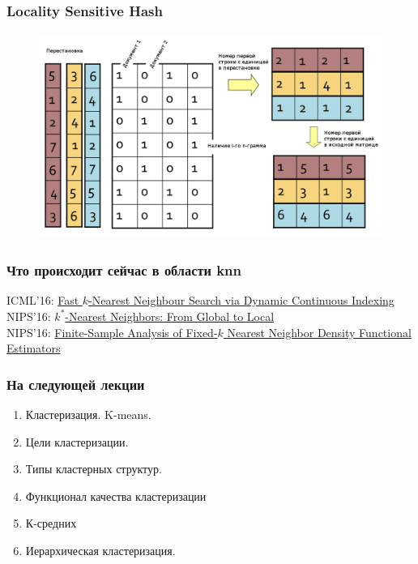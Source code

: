 \documentclass[10pt]{beamer}
\begin{document}
\begin{frame}\frametitle{Locality Sensitive Hash}
	\begin{figure}[htbp]
	\centering
	\includegraphics[height=190pt]{images/min-hash1}  
	\end{figure}
\end{frame}

\begin{frame}\frametitle{Что происходит сейчас в области knn}
  ICML'16: \href{http://jmlr.org/proceedings/papers/v48/lic16.pdf}{Fast $k$-Nearest Neighbour Search via Dynamic Continuous Indexing}\\
  \bigbreak
  NIPS'16: \href{http://papers.nips.cc/paper/6373-k-nearest-neighbors-from-global-to-local.pdf}{$k^\ast$-Nearest Neighbors: From Global to Local}\\
  \bigbreak
  NIPS'16: \href{http://papers.nips.cc/paper/6123-finite-sample-analysis-of-fixed-k-nearest-neighbor-density-functional-estimators.pdf}{Finite-Sample Analysis of Fixed-$k$ Nearest Neighbor Density Functional Estimators}\\
\end{frame}

\begin{frame}\frametitle{На следующей лекции}
	\begin{enumerate} [--]
		\item Кластеризация.  K-means.
		\item Цели кластеризации.
		\item Типы кластерных структур.
		\item Функционал качества кластеризации
		\item К-средних
		\item Иерархическая кластеризация.
	\end{enumerate}
\end{frame}
\end{document}
